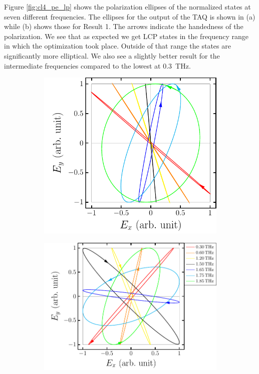 Figure \ref{fig:cl4_pe_lp} shows the polarization ellipses of the normalized states at seven different frequencies. The ellipses for the output of the TAQ is shown in (a) while (b) shows those for Result 1. The arrows indicate the handedness of the polarization. We see that as expected we get LCP states in the frequency range in which the optimization took place. Outside of that range the states are significantly more elliptical. We also see a slightly better result for the intermediate frequencies compared to the lowest at \SI{0.3}{\tera \hertz}. 


\begin{figure}[H]
    \begin{subfigure}[b]{.5\linewidth}
    \caption{}\label{}
    \centering\includegraphics[scale=0.7]{images/results/plots/ceramic/pe_cl4_cp_a.pdf}
    \end{subfigure}%
    \begin{subfigure}[b]{.5\linewidth}
    \caption{}\label{}
    \centering\includegraphics[scale=0.7]{images/results/plots/ceramic/pe_cl4_cp_b.pdf}

\end{subfigure}
\end{figure}
